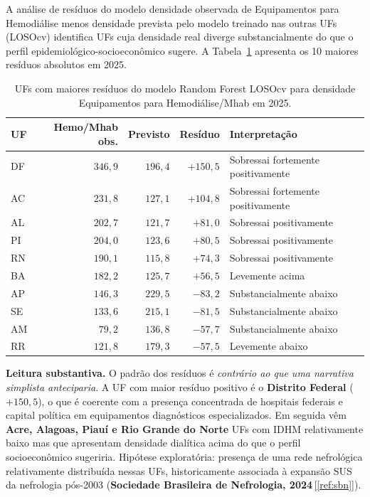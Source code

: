 \documentclass[12pt,a4paper,oneside]{article}
\begin{document}
A análise de resíduos do modelo \textemdash{} densidade observada
de Equipamentos para Hemodiálise menos densidade prevista pelo
modelo treinado nas outras UFs (LOSOcv) \textemdash{} identifica
UFs cuja densidade real diverge substancialmente do que o perfil
epidemiológico-socioeconômico sugere. A
Tabela~\ref{tab:rf-residuos} apresenta os 10 maiores resíduos
absolutos em 2025.

\begin{table}[htbp]
\centering
\caption{UFs com maiores resíduos do modelo Random Forest
LOSOcv para densidade Equipamentos para Hemodiálise/Mhab em 2025.}
\label{tab:rf-residuos}
\small
\begin{tabular}{l r r r l}
\toprule
\textbf{UF} & \textbf{Hemo/Mhab obs.} & \textbf{Previsto} &
\textbf{Resíduo} & \textbf{Interpretação} \\
\midrule
DF & $346{,}9$ & $196{,}4$ & $+150{,}5$ & Sobressai fortemente positivamente \\
AC & $231{,}8$ & $127{,}1$ & $+104{,}8$ & Sobressai fortemente positivamente \\
AL & $202{,}7$ & $121{,}7$ & $+81{,}0$  & Sobressai positivamente \\
PI & $204{,}0$ & $123{,}6$ & $+80{,}5$  & Sobressai positivamente \\
RN & $190{,}1$ & $115{,}8$ & $+74{,}3$  & Sobressai positivamente \\
BA & $182{,}2$ & $125{,}7$ & $+56{,}5$  & Levemente acima \\
\midrule
AP & $146{,}3$ & $229{,}5$ & $-83{,}2$  & Substancialmente abaixo \\
SE & $133{,}6$ & $215{,}1$ & $-81{,}5$  & Substancialmente abaixo \\
AM & $79{,}2$  & $136{,}8$ & $-57{,}7$  & Substancialmente abaixo \\
RR & $121{,}8$ & $179{,}3$ & $-57{,}5$  & Levemente abaixo \\
\bottomrule
\end{tabular}
\end{table}

\textbf{Leitura substantiva.} O padrão dos resíduos é
\textit{contrário ao que uma narrativa simplista anteciparia}.
A UF com maior resíduo positivo é o \textbf{Distrito Federal}
($+150{,}5$), o que é coerente com a presença concentrada de
hospitais federais e capital política em equipamentos
diagnósticos especializados. Em seguida vêm \textbf{Acre,
Alagoas, Piauí e Rio Grande do Norte} \textemdash{} UFs com
IDHM relativamente baixo mas que apresentam densidade dialítica
acima do que o perfil socioeconômico sugeriria. Hipótese
exploratória: presença de uma rede nefrológica relativamente
distribuída nessas UFs, historicamente associada à expansão SUS
da nefrologia pós-2003 (\textbf{Sociedade Brasileira de
Nefrologia, 2024}\,[\ref{ref:sbn}]).
\end{document}
